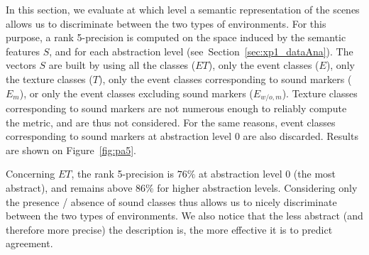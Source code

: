\documentclass[12pt]{elsarticle}
\newcommand{\ie}{\emph{i.\,e.}}
\newcommand{\cf}{cf.}
\begin{document}
In this section, we evaluate at which level a semantic representation of the scenes allows us to discriminate between the two types of environments. For this purpose, a rank 5-precision is computed on the space induced by the semantic features $S$, and for each abstraction level (see~Section~\ref{sec:xp1_dataAna}). The vectors $S$ are built by using all the classes ($ET$), only the event classes ($E$), only the texture classes ($T$), only the event classes corresponding to sound markers ($E_m$), or only the event classes excluding sound markers ($E_{w/o,m}$). Texture classes corresponding to sound markers are not numerous enough to reliably compute the metric, and are thus not considered. For the same reasons, event classes corresponding to sound markers at abstraction level $0$ are also discarded. Results are shown on Figure~\ref{fig:pa5}.



Concerning $ET$, the rank 5-precision is $76\%$ at abstraction level $0$ (the most abstract), and remains above $86\%$ for higher abstraction levels. Considering only the presence / absence of sound classes thus allows us to nicely discriminate between the two types of environments. We also notice that the less abstract (and therefore more precise) the description is, the more effective it is to predict agreement.


\end{document}
